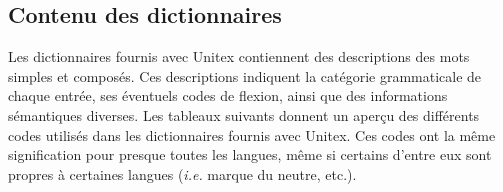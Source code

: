 \subsection{Contenu des dictionnaires}

Les dictionnaires fournis avec Unitex contiennent des descriptions des mots simples et
composés. Ces descriptions indiquent la catégorie grammaticale de chaque entrée, ses 
éventuels codes de flexion, ainsi que des informations sémantiques diverses. Les tableaux 
suivants donnent un aperçu des différents codes utilisés dans les dictionnaires fournis avec
Unitex. Ces codes ont la même signification pour presque toutes les langues, même si certains
d’entre eux sont propres à certaines langues (\textit{i.e.} marque du neutre, etc.).


